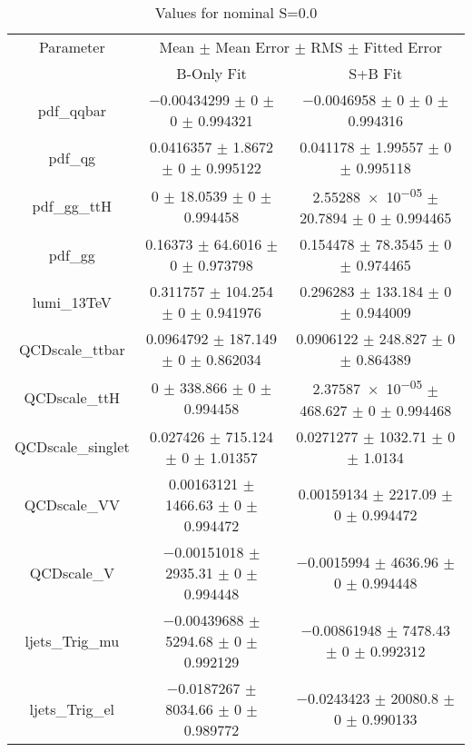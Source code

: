\begin{table}
\centering
\caption{Values for nominal S=0.0}
\begin{tabular}{ccc}
\toprule
Parameter & \multicolumn{2}{c}{Mean $\pm$ Mean Error $\pm$ RMS $\pm$ Fitted Error}\\
 & B-Only Fit & S+B Fit\\
\midrule
pdf\_qqbar & \num{-0.00434299} $\pm$ \num{0} $\pm$ \num{0} $\pm$ \num{0.994321} & \num{-0.0046958} $\pm$ \num{0} $\pm$ \num{0} $\pm$ \num{0.994316}\\
pdf\_qg & \num{0.0416357} $\pm$ \num{1.8672} $\pm$ \num{0} $\pm$ \num{0.995122} & \num{0.041178} $\pm$ \num{1.99557} $\pm$ \num{0} $\pm$ \num{0.995118}\\
pdf\_gg\_ttH & \num{0} $\pm$ \num{18.0539} $\pm$ \num{0} $\pm$ \num{0.994458} & \num{2.55288e-05} $\pm$ \num{20.7894} $\pm$ \num{0} $\pm$ \num{0.994465}\\
pdf\_gg & \num{0.16373} $\pm$ \num{64.6016} $\pm$ \num{0} $\pm$ \num{0.973798} & \num{0.154478} $\pm$ \num{78.3545} $\pm$ \num{0} $\pm$ \num{0.974465}\\
lumi\_13TeV & \num{0.311757} $\pm$ \num{104.254} $\pm$ \num{0} $\pm$ \num{0.941976} & \num{0.296283} $\pm$ \num{133.184} $\pm$ \num{0} $\pm$ \num{0.944009}\\
QCDscale\_ttbar & \num{0.0964792} $\pm$ \num{187.149} $\pm$ \num{0} $\pm$ \num{0.862034} & \num{0.0906122} $\pm$ \num{248.827} $\pm$ \num{0} $\pm$ \num{0.864389}\\
QCDscale\_ttH & \num{0} $\pm$ \num{338.866} $\pm$ \num{0} $\pm$ \num{0.994458} & \num{2.37587e-05} $\pm$ \num{468.627} $\pm$ \num{0} $\pm$ \num{0.994468}\\
QCDscale\_singlet & \num{0.027426} $\pm$ \num{715.124} $\pm$ \num{0} $\pm$ \num{1.01357} & \num{0.0271277} $\pm$ \num{1032.71} $\pm$ \num{0} $\pm$ \num{1.0134}\\
QCDscale\_VV & \num{0.00163121} $\pm$ \num{1466.63} $\pm$ \num{0} $\pm$ \num{0.994472} & \num{0.00159134} $\pm$ \num{2217.09} $\pm$ \num{0} $\pm$ \num{0.994472}\\
QCDscale\_V & \num{-0.00151018} $\pm$ \num{2935.31} $\pm$ \num{0} $\pm$ \num{0.994448} & \num{-0.0015994} $\pm$ \num{4636.96} $\pm$ \num{0} $\pm$ \num{0.994448}\\
ljets\_Trig\_mu & \num{-0.00439688} $\pm$ \num{5294.68} $\pm$ \num{0} $\pm$ \num{0.992129} & \num{-0.00861948} $\pm$ \num{7478.43} $\pm$ \num{0} $\pm$ \num{0.992312}\\
ljets\_Trig\_el & \num{-0.0187267} $\pm$ \num{8034.66} $\pm$ \num{0} $\pm$ \num{0.989772} & \num{-0.0243423} $\pm$ \num{20080.8} $\pm$ \num{0} $\pm$ \num{0.990133}\\

\end{tabular}
\end{table}
